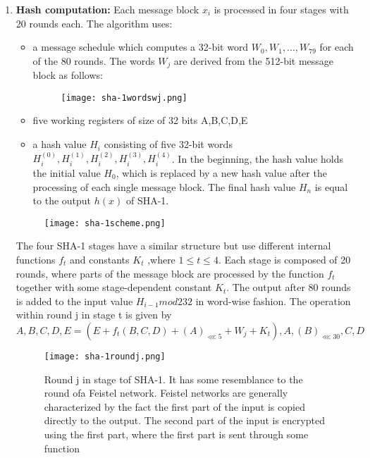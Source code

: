 \documentclass{article}
\begin{document}
\begin{enumerate}
    \item \textbf{Hash computation:} Each message block $x_i$ is processed in four stages with 20 rounds each. The algorithm uses:
    \begin{itemize}
        \item a message schedule which computes a 32-bit word $W_0,W_1, ...,W_79$ for each of the 80 rounds. The words $W_j$ are derived from the 512-bit message block as follows:
        \begin{figure} [H]
            \centering
            \texttt{[image: sha-1wordswj.png]}
        \end{figure}
        \item five working registers of size of 32 bits A,B,C,D,E
        \item a hash value $H_i$ consisting of five 32-bit words $H_i^{(0)},H_i^{(1)},H_i^{(2)},H_i^{(3)},H_i^{(4)}$. In the beginning, the hash value holds the initial value $H_0$, which is replaced by a new hash value after the processing of each single message block. The final hash value $H_n$ is equal to the output $h(x)$ of SHA-1.
    \end{itemize}
    \begin{figure} [H]
        \centering
        \texttt{[image: sha-1scheme.png]}
    \end{figure}
    The four SHA-1 stages have a similar structure but use different internal functions $f_t$ and constants $K_t$ ,where $1 \leq t \leq 4$. Each stage is composed of 20 rounds, where parts of the message block are processed by the function $f_t$ together with some stage-dependent constant $K_t$. The output after 80 rounds is added to the input value $H_{i-1} mod232$ in word-wise fashion.
    \newline\newline The operation within round j in stage t is given by
    \begin{equation*}
        A,B,C,D,E=(E+f_t(B,C,D)+(A)_{\lll 5} +W_j+ K_t),A,(B)_{\lll 30},C,D
    \end{equation*}
    \begin{figure} [H]
        \centering
        \texttt{[image: sha-1roundj.png]}
        \caption{Round j in stage tof SHA-1. It has some resemblance to the round ofa Feistel network. Feistel networks are generally characterized by the fact the first part of the input is copied directly to the output. The second part of the input is encrypted using the first part, where the first part is sent through some function}

\end{figure}
\end{enumerate}
\end{document}
